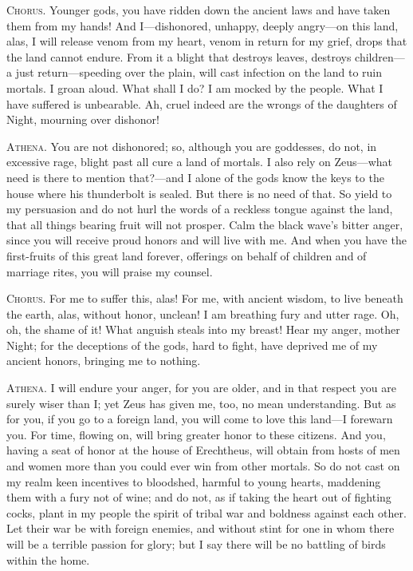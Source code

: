 \documentclass[12pt]{article}
\begin{document}
\textsc{Chorus.} Younger gods, you have ridden down the ancient laws and have taken them from my hands! And I---dishonored, unhappy, deeply angry---on this land, alas, I will release venom from my heart, venom in return for my grief, drops that the land cannot endure. From it a blight that destroys leaves, destroys children---a just return---speeding over the plain, will cast infection on the land to ruin mortals. I groan aloud. What shall I do? I am mocked by the people. What I have suffered is unbearable. Ah, cruel indeed are the wrongs of the daughters of Night, mourning over dishonor!

\textsc{Athena.} You are not dishonored; so, although you are goddesses, do not, in excessive rage, blight past all cure a land of mortals. I also rely on Zeus---what need is there to mention that?---and I alone of the gods know the keys to the house where his thunderbolt is sealed. But there is no need of that. So yield to my persuasion and do not hurl the words of a reckless tongue against the land, that all things bearing fruit will not prosper. Calm the black wave's bitter anger, since you will receive proud honors and will live with me. And when you have the first-fruits of this great land forever, offerings on behalf of children and of marriage rites, you will praise my counsel.

\textsc{Chorus.} For me to suffer this, alas! For me, with ancient wisdom, to live beneath the earth, alas, without honor, unclean! I am breathing fury and utter rage. Oh, oh, the shame of it! What anguish steals into my breast! Hear my anger, mother Night; for the deceptions of the gods, hard to fight, have deprived me of my ancient honors, bringing me to nothing.

\textsc{Athena.} I will endure your anger, for you are older, and in that respect you are surely wiser than I; yet Zeus has given me, too, no mean understanding. But as for you, if you go to a foreign land, you will come to love this land---I forewarn you. For time, flowing on, will bring greater honor to these citizens. And you, having a seat of honor at the house of Erechtheus, will obtain from hosts of men and women more than you could ever win from other mortals. So do not cast on my realm keen incentives to bloodshed, harmful to young hearts, maddening them with a fury not of wine; and do not, as if taking the heart out of fighting cocks, plant in my people the spirit of tribal war and boldness against each other. Let their war be with foreign enemies, and without stint for one in whom there will be a terrible passion for glory; but I say there will be no battling of birds within the home.
\end{document}
